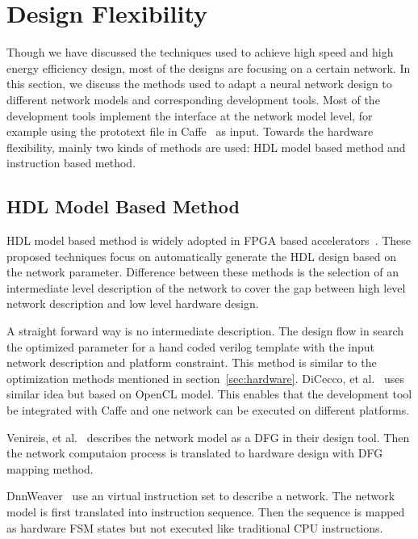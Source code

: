 \section{Design Flexibility}\label{sec:flexibility}

Though we have discussed the techniques used to achieve high speed and high energy efficiency design, most of the designs are focusing on a certain network. In this section, we discuss the methods used to adapt a neural network design to different network models and corresponding development tools. Most of the development tools implement the interface at the network model level, for example using the prototext file in Caffe~\cite{jia2014caffe} as input. Towards the hardware flexibility, mainly two kinds of methods are used: HDL model based method and instruction based method.

\subsection{HDL Model Based Method}
HDL model based method is widely adopted in FPGA based accelerators~\cite{venieris2017fpgaconvnet, morcel2017minimalist, ma2017automatic, venieris2017latency, dicecco2016caffeinated, wang2016deepburning, sharma2016high}. These proposed techniques focus on automatically generate the HDL design based on the network parameter. Difference between these methods is the selection of an intermediate level description of the network to cover the gap between high level network description and low level hardware design.

A straight forward way is no intermediate description. The design flow in \cite{ma2017automatic} search the optimized parameter for a hand coded verilog template with the input network description and platform constraint. This method is similar to the optimization methods mentioned in section~\ref{sec:hardware}. DiCecco, et al.~\cite{dicecco2016caffeinated} uses similar idea but based on OpenCL model. This enables that the development tool be integrated with Caffe and one network can be executed on different platforms. 

Venireis, et al.~\cite{venieris2017latency} describes the network model as a DFG in their design tool. Then the network computaion process is translated to hardware design with DFG mapping method.

DnnWeaver~\cite{sharma2016high} use an virtual instruction set to describe a network. The network model is first translated into instruction sequence. Then the sequence is mapped as hardware FSM states but not executed like traditional CPU instructions. 

